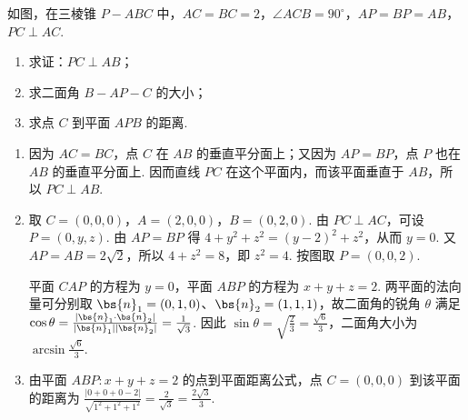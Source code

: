 \begin{problem}
如图，在三棱锥 \(P - ABC\) 中，\(AC = BC = 2\)，\(\angle ACB = 90^{\circ}\)，\(AP = BP = AB\)，\(PC \perp AC\).

\begin{enumerate}
\item 求证：\(PC \perp AB\)；
\item 求二面角 \(B - AP - C\) 的大小；
\item 求点 \(C\) 到平面 \(APB\) 的距离.
\end{enumerate}


\begin{solution}
\begin{enumerate}
\item 因为 \(AC=BC\)，点 \(C\) 在 \(AB\) 的垂直平分面上；又因为 \(AP=BP\)，点 \(P\) 也在 \(AB\) 的垂直平分面上. 因而直线 \(PC\) 在这个平面内，而该平面垂直于 \(AB\)，所以 \(PC\perp AB\).
\item 取 \(C=(0,0,0)\)，\(A=(2,0,0)\)，\(B=(0,2,0)\). 由 \(PC\perp AC\)，可设 \(P=(0,y,z)\). 由 \(AP=BP\) 得 \(4+y^2+z^2=(y-2)^2+z^2\)，从而 \(y=0\). 又 \(AP=AB=2\sqrt2\)，所以 \(4+z^2=8\)，即 \(z^2=4\). 按图取 \(P=(0,0,2)\).

平面 \(CAP\) 的方程为 \(y=0\)，平面 \(ABP\) 的方程为 \(x+y+z=2\). 两平面的法向量可分别取 \(\bs{n}_1=(0,1,0)\)、\(\bs{n}_2=(1,1,1)\)，故二面角的锐角 \(\theta\) 满足 \(\cos\theta=\frac{|\bs{n}_1\cdot\bs{n}_2|}{|\bs{n}_1||\bs{n}_2|}=\frac1{\sqrt3}\). 因此 \(\sin\theta=\sqrt{\frac23}=\frac{\sqrt6}{3}\)，二面角大小为 \(\arcsin\frac{\sqrt6}{3}\).
\item 由平面 \(ABP:x+y+z=2\) 的点到平面距离公式，点 \(C=(0,0,0)\) 到该平面的距离为 \(\frac{|0+0+0-2|}{\sqrt{1^2+1^2+1^2}}=\frac2{\sqrt3}=\frac{2\sqrt3}{3}\).
\end{enumerate}
\end{solution}
\end{problem}

